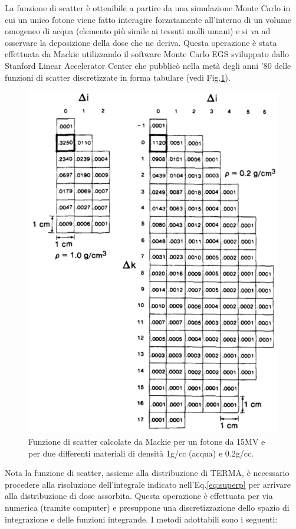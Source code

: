 {La funzione di scatter è ottenibile a partire da una simulazione Monte Carlo in cui un unico fotone viene fatto interagire forzatamente all'interno di un volume omogeneo di acqua (elemento più simile ai tessuti molli umani) e si va ad osservare la deposizione della dose che ne deriva. Questa operazione è stata effettuata da Mackie \cite{Mackie1985} utilizzando il software Monte Carlo EGS sviluppato dallo Stanford Linear Accelerator Center che pubblicò nella metà degli anni '80 delle funzioni di scatter discretizzate in forma tabulare (vedi Fig.\ref{fig:mackie_kernels}).
\begin{figure}
\centering
\includegraphics[width=.8\textwidth]{./cap1/mackie_kernels.png}
\caption{Funzione di scatter calcolate da Mackie \cite{Mackie1985} per un fotone da 15MV e per due differenti materiali di densità  1g/cc (acqua) e 0.2g/cc.}
\label{fig:mackie_kernels}
\end{figure}

Nota la funzione di scatter, assieme alla distribuzione di TERMA, è necessario procedere alla risoluzione dell'integrale indicato nell'Eq.\eqref{eq:superp} per arrivare alla distribuzione di dose assorbita. 
Questa operazione è effettuata per via numerica (tramite computer) e presuppone una discretizzazione dello spazio di integrazione e delle funzioni integrande. I metodi adottabili sono i seguenti:\\

}
